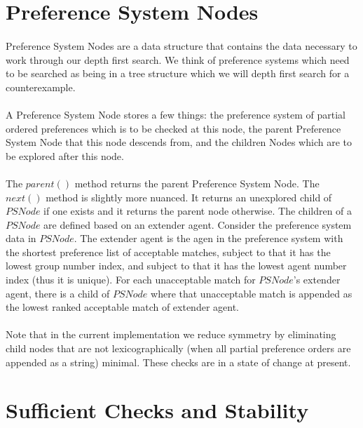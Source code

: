 \documentclass[letterpaper,12pt,oneside,onecolumn]{article}
\begin{document}
\section{Preference System Nodes}
\paragraph{}
Preference System Nodes are a data structure that contains the data necessary to work through our depth first search. We think of preference systems which need to be searched as being in a tree structure which we will depth first search for a counterexample.
\paragraph{}
A Preference System Node stores a few things: the preference system of partial ordered preferences which is to be checked at this node, the parent Preference System Node that this node descends from, and the children Nodes which are to be explored after this node.
\paragraph{}
The $parent()$ method returns the parent Preference System Node. The $next()$ method is slightly more nuanced. It returns an unexplored child of $PSNode$ if one exists and it returns the parent node otherwise. The children of a $PSNode$ are defined based on an extender agent. Consider the preference system data in $PSNode$. The extender agent is the agen in the preference system with the shortest preference list of acceptable matches, subject to that it has the lowest group number index, and subject to that it has the lowest agent number index (thus it is unique). For each unacceptable match for $PSNode$'s extender agent, there is a child of $PSNode$ where that unacceptable match is appended as the lowest ranked acceptable match of extender agent. 
\paragraph{}
Note that in the current implementation we reduce symmetry by eliminating child nodes that are not lexicographically (when all partial preference orders are appended as a string) minimal. These checks are in a state of change at present.
\section{Sufficient Checks and Stability}
\end{document}
